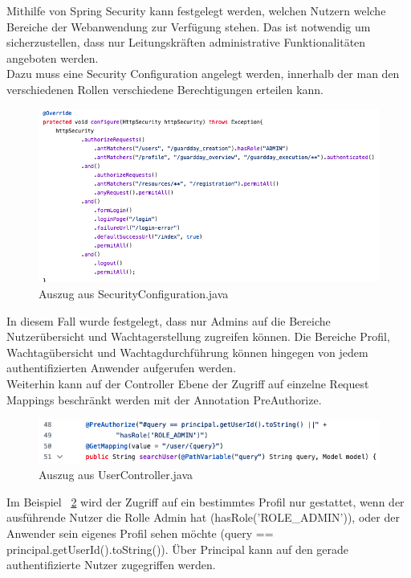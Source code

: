 \documentclass[fontsize=12pt,openright,oneside,paper=a4,BCOR=1cm]{scrbook}
\begin{document}
Mithilfe von Spring Security kann festgelegt werden, welchen Nutzern welche Bereiche der Webanwendung zur Verf\"ugung stehen. Das ist notwendig um sicherzustellen, dass nur Leitungskr\"aften administrative Funktionalit\"aten angeboten werden. \\
Dazu muss eine \glqq Security Configuration\grqq{} angelegt werden, innerhalb der man den verschiedenen Rollen verschiedene Berechtigungen erteilen kann.
\begin{figure}[H]
  \centering
    \includegraphics[width=0.7\linewidth]{Anlagen/Code/SecurityConfiguration.png}
    \caption{Auszug aus SecurityConfiguration.java}
  \label{fig:securityConfiguration}
\end{figure}

In diesem Fall wurde festgelegt, dass nur Admins auf die Bereiche \glqq Nutzer\"ubersicht\grqq{} und \glqq Wachtagerstellung\grqq{} zugreifen k\"onnen. Die Bereiche \glqq Profil\grqq{}, \glqq Wachtag\"ubersicht\grqq{} und \glqq Wachtagdurchf\"uhrung\grqq{} k\"onnen hingegen von jedem authentifizierten Anwender aufgerufen werden. \\
Weiterhin kann auf der Controller Ebene der Zugriff auf einzelne Request Mappings beschr\"ankt werden mit der Annotation \glqq PreAuthorize\grqq{}. 
\begin{figure}[H]
  \centering
    \includegraphics[width=0.7\linewidth]{Anlagen/Code/UserController.png}
    \caption{Auszug aus UserController.java}
  \label{fig:userController}
\end{figure}

Im Beispiel ~\ref{fig:userController} wird der Zugriff auf ein bestimmtes Profil nur gestattet, wenn der ausf\"uhrende Nutzer die Rolle Admin hat (\glqq hasRole('ROLE\_ADMIN')\grqq{}), oder der Anwender sein eigenes Profil sehen m\"ochte (\glqq query == principal.getUserId().toString()\grqq{}). \"Uber Principal kann auf den gerade authentifizierte Nutzer zugegriffen werden.
\end{document}
